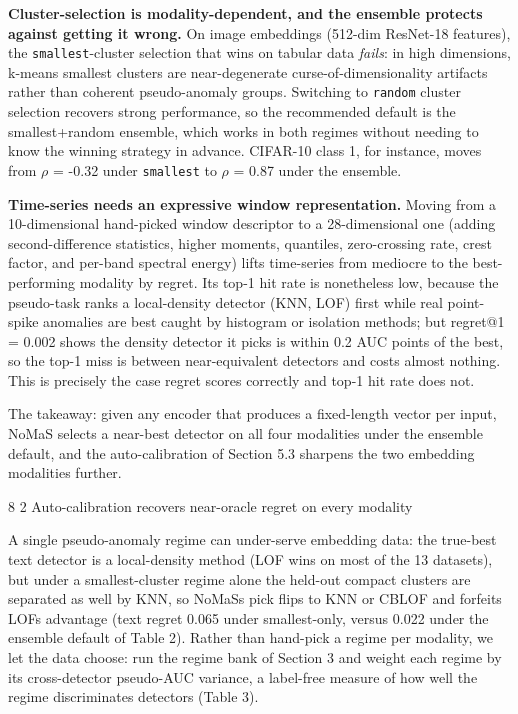 \documentclass[3p,twocolumn]{elsarticle}
\makeatletter
\renewcommand\subsection{\@startsection{subsection}{2}{\z@}%
           {8\p@ \@plus 4\p@ \@minus 4\p@}%
           {2\p@ \@plus 4\p@ \@minus 3\p@}%
           {\normalfont\normalsize\itshape}}
\makeatother
\begin{document}
\textbf{Cluster-selection is modality-dependent, and the ensemble protects against getting it wrong.} On image embeddings (512-dim ResNet-18 features), the \texttt{smallest}-cluster selection that wins on tabular data \emph{fails}: in high dimensions, k-means\textquotesingle{} smallest clusters are near-degenerate curse-of-dimensionality artifacts rather than coherent pseudo-anomaly groups. Switching to \texttt{random} cluster selection recovers strong performance, so the recommended default is the smallest+random ensemble, which works in both regimes without needing to know the winning strategy in advance. CIFAR-10 class 1, for instance, moves from $\rho$ = -0.32 under \texttt{smallest} to $\rho$ = 0.87 under the ensemble.

\textbf{Time-series needs an expressive window representation.} Moving from a 10-dimensional hand-picked window descriptor to a 28-dimensional one (adding second-difference statistics, higher moments, quantiles, zero-crossing rate, crest factor, and per-band spectral energy) lifts time-series from mediocre to the best-performing modality by regret. Its top-1 hit rate is nonetheless low, because the pseudo-task ranks a local-density detector (KNN, LOF) first while real point-spike anomalies are best caught by histogram or isolation methods; but regret@1 = 0.002 shows the density detector it picks is within 0.2 AUC points of the best, so the top-1 miss is between near-equivalent detectors and costs almost nothing. This is precisely the case regret scores correctly and top-1 hit rate does not.

The takeaway: given any encoder that produces a fixed-length vector per input, NoMaS selects a near-best detector on all four modalities under the ensemble default, and the auto-calibration of Section 5.3 sharpens the two embedding modalities further.

\subsection{Auto-calibration recovers near-oracle regret on every modality}\label{53-auto-calibration-recovers-near-oracle-regret-on-every-modality}

A single pseudo-anomaly regime can under-serve embedding data: the true-best text detector is a local-density method (LOF wins on most of the 13 datasets), but under a smallest-cluster regime alone the held-out compact clusters are separated as well by KNN, so NoMaS\textquotesingle s pick flips to KNN or CBLOF and forfeits LOF\textquotesingle s advantage (text regret 0.065 under smallest-only, versus 0.022 under the ensemble default of Table 2). Rather than hand-pick a regime per modality, we let the data choose: run the regime bank of Section 3 and weight each regime by its cross-detector pseudo-AUC variance, a label-free measure of how well the regime discriminates detectors (Table 3).
\end{document}
